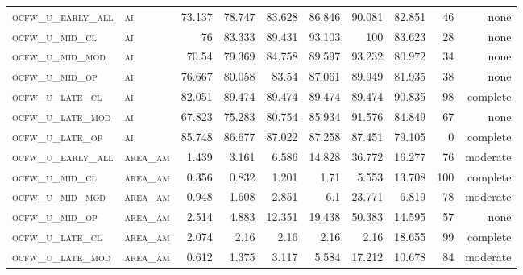 \begin{landscape}
\begin{center}
\begin{footnotesize}
\begin{longtable}{llrrrrr|rrr}
\textsc{ocfw\_u\_early\_all} & \textsc{ai        }    & 73.137   & 78.747   & 83.628   & 86.846   & 90.081    & 82.851        & 46            & none       \\
\textsc{ocfw\_u\_mid\_cl   } & \textsc{ai        }    & 76       & 83.333   & 89.431   & 93.103   & 100       & 83.623        & 28            & none       \\
\textsc{ocfw\_u\_mid\_mod  } & \textsc{ai        }    & 70.54    & 79.369   & 84.758   & 89.597   & 93.232    & 80.972        & 34            & none       \\
\textsc{ocfw\_u\_mid\_op   } & \textsc{ai        }    & 76.667   & 80.058   & 83.54    & 87.061   & 89.949    & 81.935        & 38            & none       \\
\textsc{ocfw\_u\_late\_cl  } & \textsc{ai        }    & 82.051   & 89.474   & 89.474   & 89.474   & 89.474    & 90.835        & 98            & complete       \\
\textsc{ocfw\_u\_late\_mod } & \textsc{ai        }    & 67.823   & 75.283   & 80.754   & 85.934   & 91.576    & 84.849        & 67            & none       \\
\textsc{ocfw\_u\_late\_op  } & \textsc{ai        }    & 85.748   & 86.677   & 87.022   & 87.258   & 87.451    & 79.105        & 0             & complete           \\
\textsc{ocfw\_u\_early\_all} & \textsc{area\_am  }    & 1.439    & 3.161    & 6.586    & 14.828   & 36.772    & 16.277        & 76            & moderate       \\
\textsc{ocfw\_u\_mid\_cl   } & \textsc{area\_am  }    & 0.356    & 0.832    & 1.201    & 1.71     & 5.553     & 13.708        & 100           & complete            \\
\textsc{ocfw\_u\_mid\_mod  } & \textsc{area\_am  }    & 0.948    & 1.608    & 2.851    & 6.1      & 23.771    & 6.819         & 78            & moderate       \\
\textsc{ocfw\_u\_mid\_op   } & \textsc{area\_am  }    & 2.514    & 4.883    & 12.351   & 19.438   & 50.383    & 14.595        & 57            & none       \\
\textsc{ocfw\_u\_late\_cl  } & \textsc{area\_am  }    & 2.074    & 2.16     & 2.16     & 2.16     & 2.16      & 18.655        & 99            & complete       \\
\textsc{ocfw\_u\_late\_mod } & \textsc{area\_am  }    & 0.612    & 1.375    & 3.117    & 5.584    & 17.212    & 10.678        & 84            & moderate       \\

\end{longtable}
\end{footnotesize}
\end{center}
\end{landscape}

